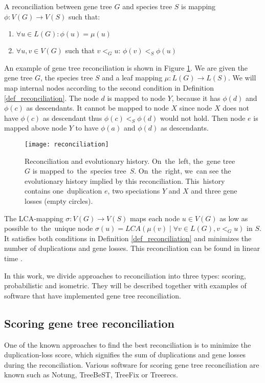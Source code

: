 \begin{definition}
A reconciliation between gene tree $G$ and species tree $S$ is mapping $\phi: V(G) \rightarrow V(S)$ such that:
	\begin{enumerate}\itemsep0em
	\item $\forall u \in L(G): \phi(u) = \mu(u)$
	\item $\forall u, v \in V(G)$ such that $v<_Gu$: $\phi(v)<_S\phi(u)$
	\end{enumerate}
	\label{def_reconciliation}
\end{definition}

An example of gene tree reconciliation is shown in Figure \ref{reconciliation}. We are given the gene tree $G$, the species tree $S$ and a leaf mapping $\mu: L(G) \rightarrow L(S)$. We will map internal nodes according to the second condition in Definition \ref{def_reconciliation}. The node $d$ is mapped to node $Y$, because it has $\phi(d)$ and $\phi(c)$ as descendants. It cannot be mapped to node $X$ since node $X$ does not have $\phi(c)$ as descendant thus $\phi(c)<_S\phi(d)$ would not hold. Then node $e$ is mapped above node $Y$ to have $\phi(a)$ and $\phi(d)$ as descendants.

\begin{figure}[ht!]
	\centering
	\label{reconciliation}
  	\texttt{[image: reconciliation]}
  	\caption[Reconciliation and evolutionary history]{Reconciliation and evolutionary history. On~the~left, the~gene tree~$G$ is mapped to~the~species tree~$S$. On~the~right, we~can see the evolutionary history implied by this reconciliation. This~history contains one~duplication $e$, two speciations $Y$ and $X$ and three gene losses (empty circles).}
\end{figure}

The LCA-mapping $\sigma: V(G) \rightarrow V(S)$ maps each node $u \in V(G)$ as low as possible to~the~unique node $\sigma(u) = LCA(\mu(v) \mid \forall v \in L(G), v<_Gu)$ in $S$. It satisfies both conditions in Definition \ref{def_reconciliation} and minimizes the number of duplications and gene losses. This reconciliation can be found in linear time \cite{hasic}.

In this work, we divide approaches to reconciliation into three types: scoring, probabilistic and isometric. They will be described together with examples of software that have implemented gene tree reconciliation. 

\subsection{Scoring gene tree reconciliation}
One of the known approaches to find the best reconciliation is to minimize the duplication-loss score, which signifies the sum of duplications and gene losses during the reconciliation. Various software for scoring gene tree reconciliation are known such as Notung, TreeBeST, TreeFix or Treerecs.

